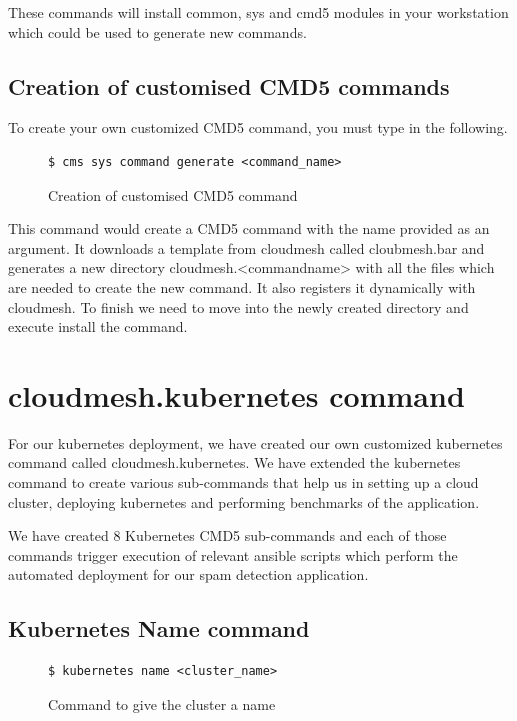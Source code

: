 \documentclass[9pt,twocolumn,twoside]{../../styles/osajnl}
\begin{document}
{These commands will install common, sys and cmd5 modules in your
workstation which could be used to generate new commands.

\subsection{Creation of customised CMD5 commands}
To create your own customized CMD5 command, you must type in the
following.

\begin{figure}[H]
\begin{verbatim}
$ cms sys command generate <command_name>
\end{verbatim}
\caption{Creation of customised CMD5 command}
\label{Creation of customised CMD5 command}
\end{figure}


\noindent
This command would create a CMD5 command with the name provided as an
argument. It downloads a template from cloudmesh called cloubmesh.bar
and generates a new directory cloudmesh.<command\textunderscore name>
with all the files which are needed to create the new command. It also
registers it dynamically with cloudmesh. To finish we need to move
into the newly created directory and execute install the command.

\section{cloudmesh.kubernetes command}
For our kubernetes deployment, we have
created our own customized kubernetes command called
cloudmesh.kubernetes. We have extended the kubernetes command to
create various sub-commands that help us in setting up a cloud cluster,
deploying kubernetes and performing benchmarks of the application.

\noindent
We have created 8 Kubernetes CMD5 sub-commands and each of those
commands trigger execution of relevant ansible scripts which perform
the automated deployment for our spam detection application.\newline

\subsection{Kubernetes Name command}
\begin{figure}[H]
\begin{verbatim}
$ kubernetes name <cluster_name>
\end{verbatim}
\caption{Command to give the cluster a name}
\vspace{-4mm}
\label{Command to given the cluster a name}
\end{figure}

}
\end{document}
